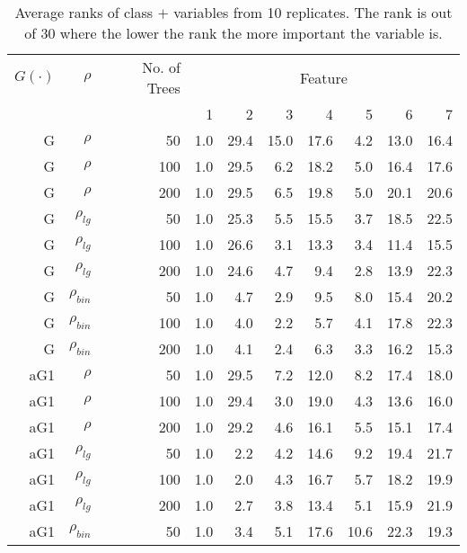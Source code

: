 \documentclass[twoside,11pt]{article}
\begin{document}
\begin{table}%
  \centering
  \caption{Average ranks of class $+$ variables from 10 replicates. The rank is out of 30 where the lower the rank the more important the variable is.}

\begin{tabular}{rrrrrrrrrr}
\hline
$G(\cdot)$ & $\rho$ & No. of Trees & \multicolumn{7}{c}{Feature}\\
 &  &  &  1 &  2 &  3 &  4 &  5 &  6 &  7 \bigstrut\\
\hline
G     & $\rho$ & 50    & 1.0   & 29.4  & 15.0  & 17.6  & 4.2   & 13.0  & 16.4 \bigstrut[t]\\
G     & $\rho$ & 100   & 1.0   & 29.5  & 6.2   & 18.2  & 5.0   & 16.4  & 17.6 \\
G     & $\rho$ & 200   & 1.0   & 29.5  & 6.5   & 19.8  & 5.0   & 20.1  & 20.6 \bigstrut[b]\\
\hline
G     & $\rho_{lg}$ & 50    & 1.0   & 25.3  & 5.5   & 15.5  & 3.7   & 18.5  & 22.5 \bigstrut[t]\\
G     & $\rho_{lg}$ & 100   & 1.0   & 26.6  & 3.1   & 13.3  & 3.4   & 11.4  & 15.5 \\
G     & $\rho_{lg}$ & 200   & 1.0   & 24.6  & 4.7   & 9.4   & 2.8   & 13.9  & 22.3 \bigstrut[b]\\
\hline
G     & $\rho_{bin}$ & 50    & 1.0   & 4.7   & 2.9   & 9.5   & 8.0   & 15.4  & 20.2 \bigstrut[t]\\
G     & $\rho_{bin}$ & 100   & 1.0   & 4.0   & 2.2   & 5.7   & 4.1   & 17.8  & 22.3 \\
G     & $\rho_{bin}$ & 200   & 1.0   & 4.1   & 2.4   & 6.3   & 3.3   & 16.2  & 15.3 \bigstrut[b]\\
\hline
aG1   & $\rho$ & 50    & 1.0   & 29.5  & 7.2   & 12.0  & 8.2   & 17.4  & 18.0 \bigstrut[t]\\
aG1   & $\rho$ & 100   & 1.0   & 29.4  & 3.0   & 19.0  & 4.3   & 13.6  & 16.0 \\
aG1   & $\rho$ & 200   & 1.0   & 29.2  & 4.6   & 16.1  & 5.5   & 15.1  & 17.4 \bigstrut[b]\\
\hline
aG1   & $\rho_{lg}$ & 50    & 1.0   & 2.2   & 4.2   & 14.6  & 9.2   & 19.4  & 21.7 \bigstrut[t]\\
aG1   & $\rho_{lg}$ & 100   & 1.0   & 2.0   & 4.3   & 16.7  & 5.7   & 18.2  & 19.9 \\
aG1   & $\rho_{lg}$ & 200   & 1.0   & 2.7   & 3.8   & 13.4  & 5.1   & 15.9  & 21.9 \bigstrut[b]\\
\hline
aG1   & $\rho_{bin}$ & 50    & 1.0   & 3.4   & 5.1   & 17.6  & 10.6  & 22.3  & 19.3 \bigstrut[t]\\

\end{tabular}
\end{table}
\end{document}
